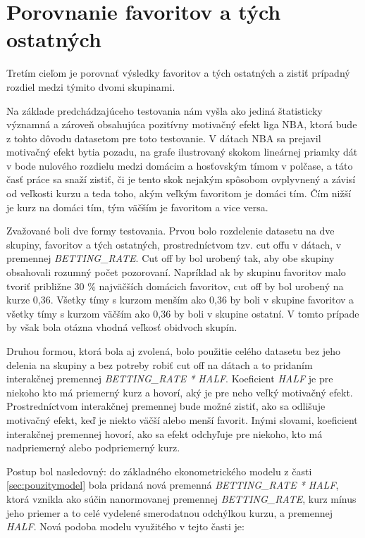 \documentclass[
  digital, %
  twoside, %
  notable,   %
  lof,     %
  lot,     %
]{fithesis3}
\begin{document}
	\section{Porovnanie favoritov a tých ostatných}
	Tretím cieľom je porovnať výsledky favoritov a tých ostatných a zistiť prípadný rozdiel medzi týmito dvomi skupinami.

	Na základe predchádzajúceho testovania nám vyšla ako jediná štatisticky významná a zároveň obsahujúca pozitívny motivačný efekt liga NBA, ktorá bude z tohto dôvodu datasetom pre toto testovanie. V dátach NBA sa prejavil motivačný efekt bytia pozadu, na grafe ilustrovaný skokom lineárnej priamky dát v bode nulového rozdielu medzi domácim a hosťovským tímom v polčase, a táto časť práce sa snaží zistiť, či je tento skok nejakým spôsobom ovplyvnený a závisí od veľkosti kurzu a teda toho, akým veľkým favoritom je domáci tím. Čím nižší je kurz na domáci tím, tým väčším je favoritom a vice versa. 

	Zvažované boli dve formy testovania. Prvou bolo rozdelenie datasetu na dve skupiny, favoritov a tých ostatných, prostredníctvom tzv. cut offu v dátach, v premennej \textit{BETTING\_RATE}. Cut off by bol urobený tak, aby obe skupiny obsahovali rozumný počet pozorovaní. Napríklad ak by skupinu favoritov malo tvoriť približne 30 \% najväčších domácich favoritov, cut off by bol urobený na kurze 0,36. Všetky tímy s kurzom menším ako 0,36 by boli v skupine favoritov a všetky tímy s kurzom väčším ako 0,36 by boli v skupine ostatní. V tomto prípade by však bola otázna vhodná veľkosť obidvoch skupín.

	Druhou formou, ktorá bola aj zvolená, bolo použitie celého datasetu bez jeho delenia na skupiny a bez potreby robiť cut off na dátach a to pridaním interakčnej premennej \textit{BETTING\_RATE * HALF}. Koeficient \textit{HALF} je pre niekoho kto má priemerný kurz a hovorí, aký je pre neho veľký motivačný efekt. Prostredníctvom interakčnej premennej bude možné zistiť, ako sa odlišuje motivačný efekt, keď je niekto väčší alebo menší favorit. Inými slovami, koeficient interakčnej premennej hovorí, ako sa efekt odchyľuje pre niekoho, kto má nadpriemerný alebo podpriemerný kurz. 
	
	Postup bol nasledovný: do základného ekonometrického modelu z časti \ref{sec:pouzitymodel} bola pridaná nová premenná \textit{BETTING\_RATE * HALF}, ktorá vznikla ako súčin nanormovanej premennej \textit{BETTING\_RATE}, kurz mínus jeho priemer a to celé vydelené smerodatnou odchýlkou kurzu, a premennej \textit{HALF}. Nová podoba modelu využitého v tejto časti je:
	
\end{document}
